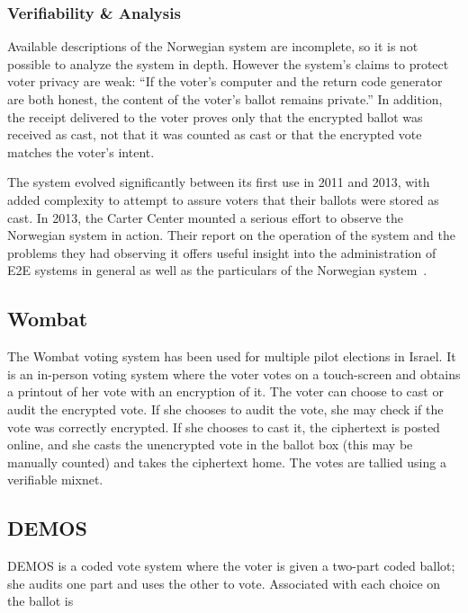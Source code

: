 \subsubsection{Verifiability \& Analysis}

Available descriptions of the Norwegian system are incomplete, so it
is not possible to analyze the system in depth. However the system's
claims to protect voter privacy are weak: ``If the voter's computer
and the return code generator are both honest, the content of the
voter's ballot remains private.'' In addition, the receipt delivered
to the voter proves only that the encrypted ballot was received as
cast, not that it was counted as cast or that the encrypted vote
matches the voter's intent.

The system evolved significantly between its first use in 2011 and
2013, with added complexity to attempt to assure voters that their
ballots were stored as cast. In 2013, the Carter Center mounted a
serious effort to observe the Norwegian system in action. Their
report on the operation of the system and the problems
they had observing it offers useful insight into the administration of
E2E systems in general as well as the particulars of the Norwegian
system~\cite{carter2013}.

\subsection{Wombat~\cite{rosen2011}}

The Wombat voting system has been used for multiple pilot elections in
Israel. It is an in-person voting system where the voter votes on a
touch-screen and obtains a printout of her vote with an encryption of
it. The voter can choose to cast or audit the encrypted vote. If she
chooses to audit the vote, she may check if the vote was correctly
encrypted. If she chooses to cast it, the ciphertext is posted online,
and she casts the unencrypted vote in the ballot box (this may be
manually counted) and takes the ciphertext home. The votes are tallied
using a verifiable mixnet.

\subsection{DEMOS~\cite{kiayias2014}}

DEMOS is a coded vote system where the voter is given a two-part coded
ballot; she audits one part and uses the other to vote. Associated
with each choice on the ballot is

